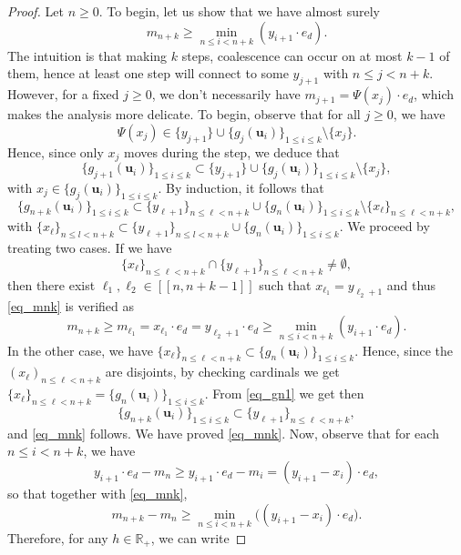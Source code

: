 \documentclass[a4paper, 11pt]{article}
\theoremstyle{plain}
\theoremstyle{definition}
\newcommand{\R}{\mathbb{R}}
\newcommand{\range}[2]{[\![#1,#2]\!]}
\numberwithin{equation}{section}
\begin{document}
\begin{proof}
    Let $n\geq 0$. To begin, let us show that we have almost surely
        \begin{equation}
            \label{eq_mnk}
            m_{n+k}\geq\min_{n\leq i< n+k}(y_{i+1}\cdot e_d).
        \end{equation}
    The intuition is that making $k$ steps, coalescence can occur on at most $k-1$ of them, hence at least one step will connect to some $y_{j+1}$ with $n\leq j<n+k$. However, for a fixed $j\geq0$, we don't necessarily have $m_{j+1}=\Psi(x_j)\cdot e_d$, which makes the analysis more delicate. To begin, observe that for all $j\geq 0$, we have
        \[\Psi(x_j)\in\{y_{j+1}\}\cup\{g_j(\mathbf u_i)\}_{1\leq i\leq k}\setminus\{x_j\}.\]
    Hence, since only $x_j$ moves during the step, we deduce that
        \[\{g_{j+1}(\mathbf u_i)\}_{1\leq i\leq k}\subset\{y_{j+1}\}\cup\{g_j(\mathbf u_i)\}_{1\leq i\leq k}\setminus\{x_j\},\]
    with $x_j\in\{g_j(\mathbf u_i)\}_{1\leq i\leq k}$. By induction, it follows that
        \begin{equation}
            \label{eq_gn1}
            \{g_{n+k}(\mathbf u_i)\}_{1\leq i\leq k}\subset\{y_{\ell+1}\}_{n\leq \ell<n+k}\cup\{g_n(\mathbf u_i)\}_{1\leq i\leq k}\setminus\{x_\ell\}_{n\leq \ell<n+k},
        \end{equation}
    with $\{x_\ell\}_{n\leq l<n+k}\subset\{y_{\ell+1}\}_{n\leq l<n+k}\cup\{g_n(\mathbf u_i)\}_{1\leq i\leq k}$. We proceed by treating two cases. If we have
        \[\{x_\ell\}_{n\leq \ell<n+k}\cap\{y_{\ell+1}\}_{n\leq \ell<n+k}\neq\emptyset,\]
    then there exist $\ell_1, \ell_2\in\range{n}{n+k-1}$ such that $x_{\ell_1}=y_{\ell_2+1}$ and thus \eqref{eq_mnk} is verified as
        \[m_{n+k}\geq m_{\ell_1}=x_{\ell_1}\cdot e_d=y_{\ell_2+1}\cdot e_d\geq\min_{n\leq i< n+k}(y_{i+1}\cdot e_d).\]
    In the other case, we have $\{x_\ell\}_{n\leq \ell<n+k}\subset\{g_n(\mathbf u_i)\}_{1\leq i\leq k}$. Hence, since the $(x_\ell)_{n\leq \ell<n+k}$ are disjoints, by checking cardinals we get $\{x_\ell\}_{n\leq \ell<n+k}=\{g_n(\mathbf u_i)\}_{1\leq i\leq k}$. From \eqref{eq_gn1} we get then
        \[\{g_{n+k}(\mathbf u_i)\}_{1\leq i\leq k}\subset\{y_{\ell+1}\}_{n\leq \ell<n+k},\]
    and \eqref{eq_mnk} follows. We have proved \eqref{eq_mnk}. Now, observe that for each $n\leq i<n+k$, we have
        \[y_{i+1}\cdot e_d-m_n\geq y_{i+1}\cdot e_d-m_i=(y_{i+1}-x_i)\cdot e_d,\]
    so that together with \eqref{eq_mnk},
        \[m_{n+k}-m_n\geq\min_{n\leq i< n+k}\big((y_{i+1}-x_i)\cdot e_d\big).\]
    Therefore, for any $h\in\R_+$, we can write

\end{proof}
\end{document}

